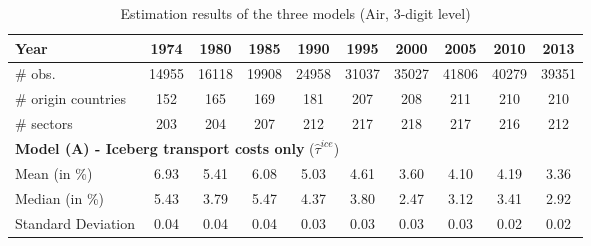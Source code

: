 \documentclass[11pt,twoside, authoryear]{elsarticle}
\begin{document}
\begin{table}[htbp]
  \centering
   \footnotesize{
    \caption{Estimation results of the three models (Air, 3-digit level)}
  \label{tab:3models_estimation_results_air}%
    \begin{tabular}{l|c c c c c c c c c}
    \hline \hline
    \textbf{Year} & \multicolumn{1}{c}{\textbf{1974}} & \multicolumn{1}{c}{\textbf{1980}} & \multicolumn{1}{c}{\textbf{1985}} & \multicolumn{1}{c}{\textbf{1990}} & \multicolumn{1}{c}{\textbf{1995}} & \multicolumn{1}{c}{\textbf{2000}} & \multicolumn{1}{c}{\textbf{2005}} & \multicolumn{1}{c}{\textbf{2010}} & \multicolumn{1}{c}{\textbf{2013}} \\ \hline
   $\#$ obs. & \multicolumn{1}{c}{14955} & \multicolumn{1}{c}{16118} & \multicolumn{1}{c}{19908} & \multicolumn{1}{c}{24958} & \multicolumn{1}{c}{31037} & \multicolumn{1}{c}{35027} & \multicolumn{1}{c}{41806} & \multicolumn{1}{c}{40279} & \multicolumn{1}{c}{39351} \\
   $\#$  origin countries & \multicolumn{1}{c}{152} & \multicolumn{1}{c}{165} & \multicolumn{1}{c}{169} & \multicolumn{1}{c}{181} & \multicolumn{1}{c}{207} & \multicolumn{1}{c}{208} & \multicolumn{1}{c}{211} & \multicolumn{1}{c}{210} & \multicolumn{1}{c}{210} \\
   $\#$  sectors & \multicolumn{1}{c}{203} & \multicolumn{1}{c}{204} & \multicolumn{1}{c}{207} & \multicolumn{1}{c}{212} & \multicolumn{1}{c}{217} & \multicolumn{1}{c}{218} & \multicolumn{1}{c}{217} & \multicolumn{1}{c}{216} & \multicolumn{1}{c}{212} \\ \hline
    \multicolumn{10}{l}{\textbf{Model (A) - Iceberg transport costs only} ($\widehat{\tau}^{ice}$)} \\ \hline
    Mean (in \%) & \multicolumn{1}{c}{6.93} & \multicolumn{1}{c}{5.41} & \multicolumn{1}{c}{6.08} & \multicolumn{1}{c}{5.03} & \multicolumn{1}{c}{4.61} & \multicolumn{1}{c}{3.60} & \multicolumn{1}{c}{4.10} & \multicolumn{1}{c}{4.19} & \multicolumn{1}{c}{3.36} \\
    Median (in \%)& \multicolumn{1}{c}{5.43} & \multicolumn{1}{c}{3.79} & \multicolumn{1}{c}{5.47} & \multicolumn{1}{c}{4.37} & \multicolumn{1}{c}{3.80} & \multicolumn{1}{c}{2.47} & \multicolumn{1}{c}{3.12} & \multicolumn{1}{c}{3.41} & \multicolumn{1}{c}{2.92} \\
    Standard Deviation & \multicolumn{1}{c}{0.04} & \multicolumn{1}{c}{0.04} & \multicolumn{1}{c}{0.04} & \multicolumn{1}{c}{0.03} & \multicolumn{1}{c}{0.03} & \multicolumn{1}{c}{0.03} & \multicolumn{1}{c}{0.03} & \multicolumn{1}{c}{0.02} & \multicolumn{1}{c}{0.02} \\ \hline

\end{tabular}}
\end{table}
\end{document}
